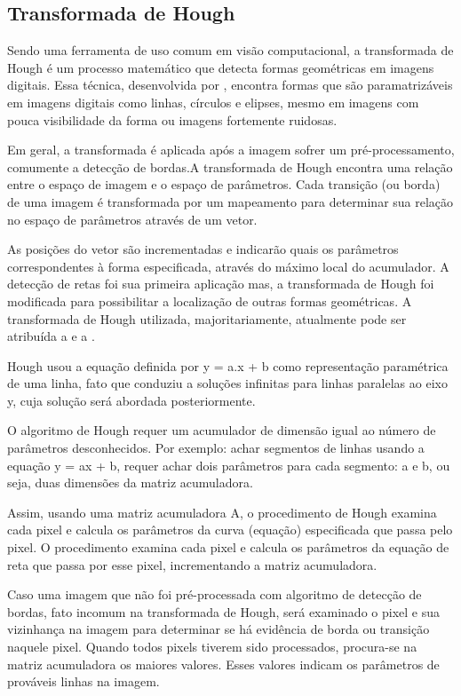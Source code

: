 \subsection{Transformada de Hough}

Sendo uma ferramenta de uso comum em visão computacional, a transformada de \\Hough é um processo matemático que detecta formas geométricas em imagens digitais. Essa técnica, desenvolvida por , encontra formas que são paramatrizáveis em imagens digitais como linhas, círculos e elipses, mesmo em imagens com pouca visibilidade da forma ou imagens fortemente ruidosas.

Em geral, a transformada é aplicada após a imagem sofrer um pré-processamento, comumente a detecção de bordas.A transformada de Hough encontra uma relação entre o espaço de imagem e o espaço de parâmetros. Cada transição (ou borda) de uma imagem é transformada por um mapeamento para determinar sua relação no espaço de parâmetros através de um vetor. 

As posições do vetor são incrementadas e indicarão quais os parâmetros correspondentes à forma especificada, através do máximo local do acumulador. A detecção de retas foi sua primeira aplicação mas, a transformada de Hough foi modificada para possibilitar a localização de outras formas geométricas. A transformada de Hough utilizada, majoritariamente, atualmente pode ser atribuída a  e a .

Hough usou a equação definida por y = a.x + b como representação paramétrica de uma linha, fato que conduziu a soluções infinitas para linhas paralelas ao eixo y, cuja solução será abordada posteriormente.
 
O algoritmo de Hough requer um acumulador de dimensão igual ao número de parâmetros desconhecidos. Por exemplo: achar segmentos de linhas usando a equação y = ax + b, requer achar dois parâmetros para cada segmento: a e b, ou seja, duas dimensões da matriz acumuladora.

Assim, usando uma matriz acumuladora A, o procedimento de Hough examina cada pixel e calcula os parâmetros da curva (equação) especificada que passa pelo pixel. 
O procedimento examina cada pixel e calcula os parâmetros da equação de reta que passa por esse pixel, incrementando a matriz acumuladora.

Caso uma imagem que não foi pré-processada com algoritmo de detecção de bordas, fato incomum na transformada de Hough, será examinado o pixel e sua vizinhança na imagem para determinar se há evidência de borda ou transição naquele pixel. Quando todos pixels tiverem sido processados, procura-se na matriz acumuladora os maiores valores. Esses valores indicam os parâmetros de prováveis linhas na imagem.

